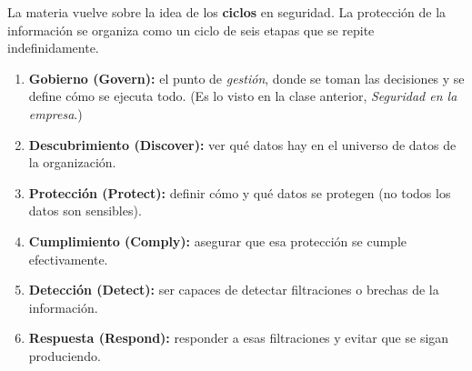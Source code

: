 \documentclass[11pt,a4paper]{article}
\begin{document}
La materia vuelve sobre la idea de los \textbf{ciclos} en seguridad. La protección de la
información se organiza como un ciclo de seis etapas que se repite indefinidamente.

\begin{center}
\end{center}

\begin{enumerate}[leftmargin=1.6em,itemsep=3pt]
  \item \textbf{Gobierno (Govern):} el punto de \emph{gestión}, donde se toman las
        decisiones y se define cómo se ejecuta todo. (Es lo visto en la clase anterior,
        \emph{Seguridad en la empresa}.)
  \item \textbf{Descubrimiento (Discover):} ver qué datos hay en el universo de datos de
        la organización.
  \item \textbf{Protección (Protect):} definir cómo y qué datos se protegen (no todos los
        datos son sensibles).
  \item \textbf{Cumplimiento (Comply):} asegurar que esa protección se cumple efectivamente.
  \item \textbf{Detección (Detect):} ser capaces de detectar filtraciones o brechas de la
        información.
  \item \textbf{Respuesta (Respond):} responder a esas filtraciones y evitar que se sigan
        produciendo.
\end{enumerate}
\end{document}
